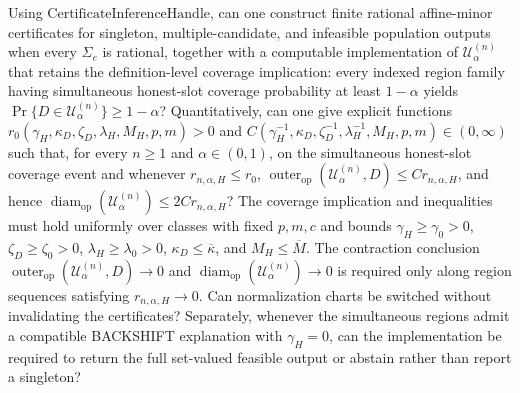 Using \(\text{CertificateInferenceHandle}\), can one construct finite rational affine-minor certificates for singleton, multiple-candidate, and infeasible population outputs when every \(\Sigma_e\) is rational, together with a computable implementation of \(\mathcal U^{(n)}_{\alpha}\) that retains the definition-level coverage implication: every indexed region family having simultaneous honest-slot coverage probability at least \(1-\alpha\) yields \(\Pr\{D\in\mathcal U^{(n)}_{\alpha}\}\ge1-\alpha\)? Quantitatively, can one give explicit functions \(r_0(\gamma_H,\kappa_D,\zeta_D,\lambda_H,M_H,p,m)>0\) and \(C(\gamma_H^{-1},\kappa_D,\zeta_D^{-1},\lambda_H^{-1},M_H,p,m)\in(0,\infty)\) such that, for every \(n\ge1\) and \(\alpha\in(0,1)\), on the simultaneous honest-slot coverage event and whenever \(r_{n,\alpha,H}\le r_0\), \(\operatorname{outer}_{\mathrm{op}}(\mathcal U^{(n)}_{\alpha},D)\le C r_{n,\alpha,H}\), and hence \(\operatorname{diam}_{\mathrm{op}}(\mathcal U^{(n)}_{\alpha})\le2C r_{n,\alpha,H}\)? The coverage implication and inequalities must hold uniformly over classes with fixed \(p,m,c\) and bounds \(\gamma_H\ge\gamma_0>0\), \(\zeta_D\ge\zeta_0>0\), \(\lambda_H\ge\lambda_0>0\), \(\kappa_D\le\overline\kappa\), and \(M_H\le\overline M\). The contraction conclusion \(\operatorname{outer}_{\mathrm{op}}(\mathcal U^{(n)}_{\alpha},D)\to0\) and \(\operatorname{diam}_{\mathrm{op}}(\mathcal U^{(n)}_{\alpha})\to0\) is required only along region sequences satisfying \(r_{n,\alpha,H}\to0\). Can normalization charts be switched without invalidating the certificates? Separately, whenever the simultaneous regions admit a compatible BACKSHIFT explanation with \(\gamma_H=0\), can the implementation be required to return the full set-valued feasible output or abstain rather than report a singleton?